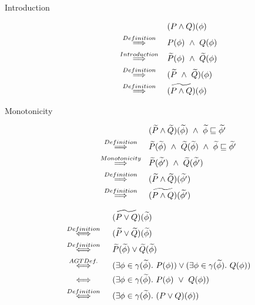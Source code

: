 \begin{proofatend}
    \begin{description}
        \item[Introduction] 
        \begin{align*}
        &(P \wedge Q)(\phi)\\
        \overset{Definition}{~\quad\quad\implies\quad\quad~}
        &P(\phi) ~\wedge~ Q(\phi)\\
        \overset{Introduction}{~\quad\quad\implies\quad\quad~}
        &\widetilde{P}(\phi) ~\wedge~ \widetilde{Q}(\phi)\\
        \overset{Definition}{~\quad\quad\implies\quad\quad~}
        &(\widetilde{P} ~\wedge~ \widetilde{Q})(\phi)\\
        \overset{Definition}{~\quad\quad\implies\quad\quad~}
        &\widetilde{(P \wedge Q)}(\phi)\\
        \end{align*}
        
        \item[Monotonicity] 
        \begin{align*}
        &(\widetilde{P} \wedge \widetilde{Q})(\widetilde{\phi}) ~\wedge~ \widetilde{\phi} \sqsubseteq \widetilde{\phi'}\\
        \overset{Definition}{~\quad\quad\implies\quad\quad~}
        &\widetilde{P}(\widetilde{\phi}) ~\wedge~ \widetilde{Q}(\widetilde{\phi}) ~\wedge~ \widetilde{\phi} \sqsubseteq \widetilde{\phi'}\\
        \overset{Monotonicity}{~\quad\quad\implies\quad\quad~}
        &\widetilde{P}(\widetilde{\phi'}) ~\wedge~ \widetilde{Q}(\widetilde{\phi'})\\
        \overset{Definition}{~\quad\quad\implies\quad\quad~}
        &(\widetilde{P} \wedge \widetilde{Q})(\widetilde{\phi'})\\
        \overset{Definition}{~\quad\quad\implies\quad\quad~}
        &\widetilde{(P \wedge Q)}(\widetilde{\phi'})\\
        \end{align*}
    \end{description}
\end{proofatend}

\begin{proofatend}
    \begin{align*}
    &\widetilde{(P \vee Q)}(\widetilde{\phi})\\
    \overset{Definition}{~\quad\quad\iff\quad\quad~}
    &(\widetilde{P} \vee \widetilde{Q})(\widetilde{\phi})\\
    \overset{Definition}{~\quad\quad\iff\quad\quad~}
    &\widetilde{P}(\widetilde{\phi}) \vee \widetilde{Q}(\widetilde{\phi})\\
    \overset{AGT Def.}{~\quad\quad\iff\quad\quad~}
    &(\exists \phi \in \gamma(\widetilde{\phi}).~ P(\phi)) \vee (\exists \phi \in \gamma(\widetilde{\phi}).~ Q(\phi))\\
    \overset{}{~\quad\quad\iff\quad\quad~}
    &(\exists \phi \in \gamma(\widetilde{\phi}).~ P(\phi) ~\vee~ Q(\phi))\\
    \overset{Definition}{~\quad\quad\iff\quad\quad~}
    &(\exists \phi \in \gamma(\widetilde{\phi}).~ (P \vee Q)(\phi))
    \end{align*}
\end{proofatend}

